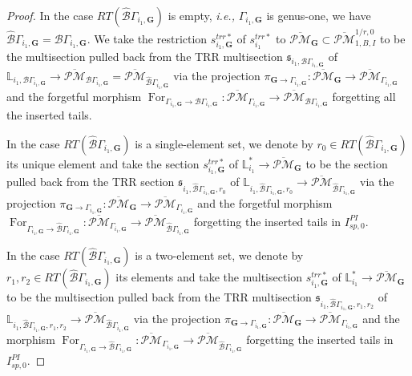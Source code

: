 \documentclass[11pt]{amsart}
\theoremstyle{definition}
\theoremstyle{remark}
\newcommand{\oPMb}{{\overline{\mathcal{PM}}}}
\newcommand{\nontilde}{}
\newcommand{\<}{\left<}
\renewcommand{\>}{\right>}
\numberwithin{equation}{section}
\begin{document}
\begin{proof}
        In the case $RT(\hat{\mathcal B}\Gamma_{i_1,\bm{G}})$ is empty, \textit{i.e.,} $\Gamma_{i_1,\bm{G}}$ is genus-one, we have $\hat{\mathcal B}\Gamma_{i_1,\bm{G}}={\mathcal B}\Gamma_{i_1,\bm{G}}$. We take the restriction $\nontilde{s}^{trr*}_{i_1,\bm{G}}$ of $\nontilde{s}^{trr*}_{i_1}$ to $\oPMb_{\bm{G}}\subset \oPMb^{1/r,0}_{1,B,I}$ to be the multisection pulled back from the TRR multisection 
        $\mathfrak s_{i_1,\mathcal B\Gamma_{i_1,\bm{G}}}$ of $\mathbb L_{i_1,\mathcal B\Gamma_{i_1,\bm{G}}}\to \oPMb_{\mathcal B\Gamma_{i_1,\bm{G}}}=\oPMb_{\hat{\mathcal B}\Gamma_{i_1,\bm{G}}}$ via the projection $\pi_{\mathbf{G}\to \Gamma_{i_1,\mathbf{G}}}\colon \oPMb_{\mathbf{G}}\to \oPMb_{\Gamma_{i_1,\mathbf{G}}}$ and the forgetful morphism $\operatorname{For}_{\Gamma_{i_1,\bm{G}}\to \mathcal B \Gamma_{i_1,\bm{G}}}\colon \oPMb_{\Gamma_{i_1,\bm{G}}}\to \oPMb_{\mathcal B \Gamma_{i_1,\bm{G}}}$ forgetting all the inserted tails. 
        
        In the case $RT(\hat{\mathcal B}\Gamma_{i_1,\bm{G}})$ is a single-element set, we denote %
by $r_0\in RT(\hat{\mathcal B}\Gamma_{i_1,\bm{G}})$ its %
unique element and take the section $\nontilde{s}^{trr*}_{i_1,\mathbf{G}}$ of ${\mathbb L}^*_{i_1}\to \oPMb_{\bm{G}}$ to be the section pulled back from the TRR section $\mathfrak s_{i_1,\hat{\mathcal B}\Gamma_{i_1,\bm{G}},r_0}$ of $\mathbb L_{i_1,\hat{\mathcal B}\Gamma_{i_1,\bm{G}},r_0}\to \oPMb_{\hat{\mathcal B}\Gamma_{i_1,\bm{G}}}$ via the projection $\pi_{\mathbf{G}\to \Gamma_{i_1,\mathbf{G}}}\colon \oPMb_{\mathbf{G}}\to \oPMb_{\Gamma_{i_1,\mathbf{G}}}$ and the forgetful morphism $\operatorname{For}_{\Gamma_{i_1,\bm{G}}\to \hat{\mathcal B} \Gamma_{i_1,\bm{G}}}\colon \oPMb_{\Gamma_{i_1,\bm{G}}}\to \oPMb_{\hat{\mathcal B} \Gamma_{i_1,\bm{G}}}$ forgetting the inserted tails in $I^{PI}_{sp,0}$.  
        
        In the case $RT(\hat{\mathcal B}\Gamma_{i_1,\bm{G}})$ is a two-element set, we denote by $r_1,r_2\in RT(\hat{\mathcal B}\Gamma_{i_1,\bm{G}})$ its elements and take the multisection $\nontilde{s}^{trr*}_{i_1,\mathbf{G}}$ of ${\mathbb L}^*_{i_1}\to \oPMb_{\bm{G}}$ to be the multisection pulled back from the TRR multisection $\mathfrak s_{i_1,\hat{\mathcal B}\Gamma_{i_1,\bm{G}},r_1,r_2}$ of $\mathbb L_{i_1,\hat{\mathcal B}\Gamma_{i_1,\bm{G}},r_1,r_2}\to \oPMb_{\hat{\mathcal B}\Gamma_{i_1,\bm{G}}}$ via the projection $\pi_{\mathbf{G}\to \Gamma_{i_1,\mathbf{G}}}\colon \oPMb_{\mathbf{G}}\to \oPMb_{\Gamma_{i_1,\mathbf{G}}}$ and the morphism $\operatorname{For}_{\Gamma_{i_1,\bm{G}}\to \hat{\mathcal B} \Gamma_{i_1,\bm{G}}}\colon \oPMb_{\Gamma_{i_1,\bm{G}}}\to \oPMb_{\hat{\mathcal B} \Gamma_{i_1,\bm{G}}}$ forgetting the inserted tails in $I^{PI}_{sp,0}$.


\end{proof}
\end{document}
